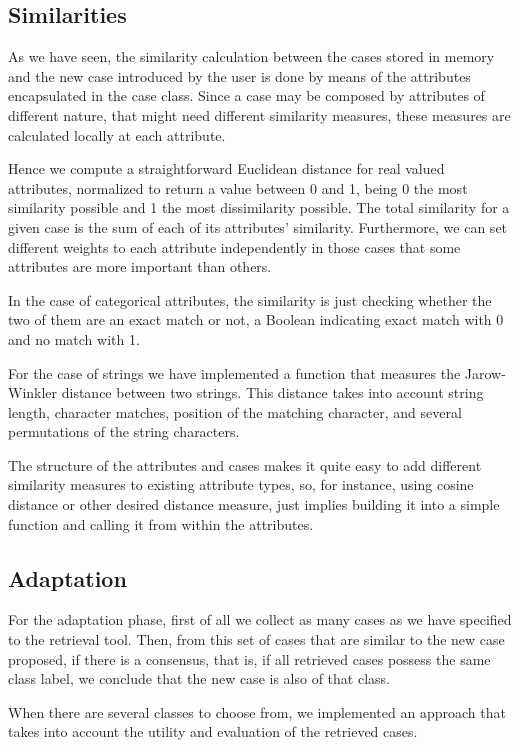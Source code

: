 \documentclass[11pt]{article}
\begin{document}
\subsection{Similarities}
As we have seen, the similarity calculation between the cases stored in memory and the new case introduced by the user is done by means of the attributes encapsulated in the case class. Since a case may be composed by attributes of different nature, that might need different similarity measures, these measures are calculated locally at each attribute. 

Hence we compute a straightforward Euclidean distance for real valued attributes, normalized to return a value between 0 and 1, being 0 the most similarity possible and 1 the most dissimilarity possible. The total similarity for a given case is the sum of each of its attributes' similarity. Furthermore, we can set different weights to each attribute independently in those cases that some attributes are more important than others. 

In the case of categorical attributes, the similarity is just checking whether the two of them are an exact match or not, a Boolean indicating exact match with 0 and no match with 1.

For the case of strings we have implemented a function that measures the Jarow-Winkler distance between two strings. This distance takes into account string length, character matches, position of the matching character, and several permutations of the string characters.

The structure of the attributes and cases makes it quite easy to add different similarity measures to existing attribute types, so, for instance, using cosine distance or other desired distance measure, just implies building it into a simple function and calling it from within the attributes.


\subsection{Adaptation}
For the adaptation phase, first of all we collect as many cases as we have specified to the retrieval tool. Then, from this set of cases that are similar to the new case proposed, if there is a consensus, that is, if all retrieved cases possess the same class label, we conclude that the new case is also of that class. 

When there are several classes to choose from, we implemented an approach that takes into account the utility and evaluation of the retrieved cases.
\end{document}
